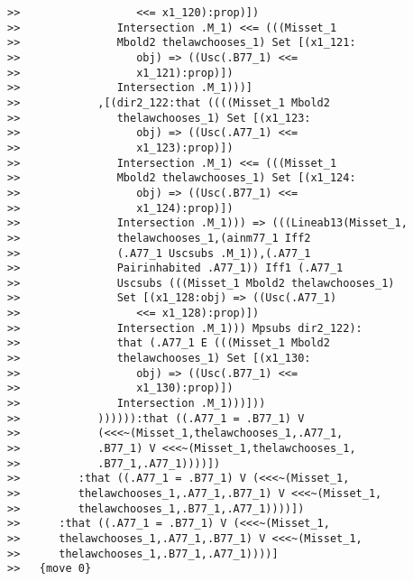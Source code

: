 \documentclass[12pt]{article}
\begin{document}
\begin{verbatim}
>>                  <<= x1_120):prop)])
>>               Intersection .M_1) <<= (((Misset_1
>>               Mbold2 thelawchooses_1) Set [(x1_121:
>>                  obj) => ((Usc(.B77_1) <<=
>>                  x1_121):prop)])
>>               Intersection .M_1)))]
>>            ,[(dir2_122:that ((((Misset_1 Mbold2
>>               thelawchooses_1) Set [(x1_123:
>>                  obj) => ((Usc(.A77_1) <<=
>>                  x1_123):prop)])
>>               Intersection .M_1) <<= (((Misset_1
>>               Mbold2 thelawchooses_1) Set [(x1_124:
>>                  obj) => ((Usc(.B77_1) <<=
>>                  x1_124):prop)])
>>               Intersection .M_1))) => (((Lineab13(Misset_1,
>>               thelawchooses_1,(ainm77_1 Iff2
>>               (.A77_1 Uscsubs .M_1)),(.A77_1
>>               Pairinhabited .A77_1)) Iff1 (.A77_1
>>               Uscsubs (((Misset_1 Mbold2 thelawchooses_1)
>>               Set [(x1_128:obj) => ((Usc(.A77_1)
>>                  <<= x1_128):prop)])
>>               Intersection .M_1))) Mpsubs dir2_122):
>>               that (.A77_1 E (((Misset_1 Mbold2
>>               thelawchooses_1) Set [(x1_130:
>>                  obj) => ((Usc(.B77_1) <<=
>>                  x1_130):prop)])
>>               Intersection .M_1)))]))
>>            )))))):that ((.A77_1 = .B77_1) V
>>            (<<<~(Misset_1,thelawchooses_1,.A77_1,
>>            .B77_1) V <<<~(Misset_1,thelawchooses_1,
>>            .B77_1,.A77_1))))])
>>         :that ((.A77_1 = .B77_1) V (<<<~(Misset_1,
>>         thelawchooses_1,.A77_1,.B77_1) V <<<~(Misset_1,
>>         thelawchooses_1,.B77_1,.A77_1))))])
>>      :that ((.A77_1 = .B77_1) V (<<<~(Misset_1,
>>      thelawchooses_1,.A77_1,.B77_1) V <<<~(Misset_1,
>>      thelawchooses_1,.B77_1,.A77_1))))]
>>   {move 0}



\end{verbatim}
\end{document}

